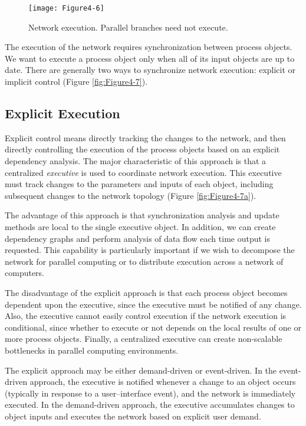 \begin{figure}[!htb]
  \centering
  \texttt{[image: Figure4-6]}\\
  \caption{Network execution. Parallel branches need not execute.}\label{fig:Figure4-6}
\end{figure}

The execution of the network requires synchronization between process objects. We want to execute a process object only when all of its input objects are up to date. There are generally two ways to synchronize network execution: explicit or implicit control (Figure \ref{fig:Figure4-7}).

\subsection{Explicit Execution}
\label{subsec:explicit_execution}

Explicit control means directly tracking the changes to the network, and then directly controlling the execution of the process objects based on an explicit dependency analysis. The major characteristic of this approach is that a centralized \emph{executive} is used to coordinate network execution. This executive must track changes to the parameters and inputs of each object, including subsequent changes to the network topology (Figure \ref{fig:Figure4-7a}).

The advantage of this approach is that synchronization analysis and update methods are local to the single executive object. In addition, we can create dependency graphs and perform analysis of data flow each time output is requested. This capability is particularly important if we wish to decompose the network for parallel computing or to distribute execution across a network of computers.

The disadvantage of the explicit approach is that each process object becomes dependent upon the executive, since the executive must be notified of any change. Also, the executive cannot easily control execution if the network execution is conditional, since whether to execute or not depends on the local results of one or more process objects. Finally, a centralized executive can create non-scalable bottlenecks in parallel computing environments.

The explicit approach may be either demand-driven or event-driven. In the event-driven approach, the executive is notified whenever a change to an object occurs (typically in response to a user--interface event), and the network is immediately executed. In the demand-driven approach, the executive accumulates changes to object inputs and executes the network based on explicit user demand.

